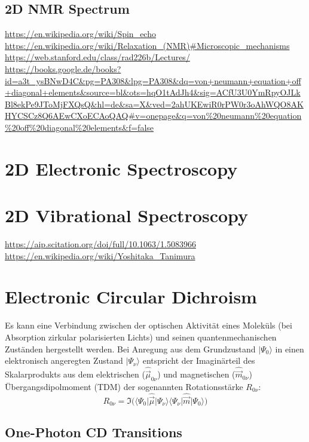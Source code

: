 \documentclass[9pt]{report}
\begin{document}
\subsection{2D NMR Spectrum}
\url{https://en.wikipedia.org/wiki/Spin_echo}\\
\url{https://en.wikipedia.org/wiki/Relaxation_(NMR)#Microscopic_mechanisms}\\
\url{https://web.stanford.edu/class/rad226b/Lectures/}\\
\url{https://books.google.de/books?id=a3t_ysBNwD4C&pg=PA308&lpg=PA308&dq=von+neumann+equation+off+diagonal+elements&source=bl&ots=hqO1tAdJh4&sig=ACfU3U0YmRpyOJLkBl8ekPe9JToMjFXQsQ&hl=de&sa=X&ved=2ahUKEwiR0rPW0r3oAhWQO8AKHYCSCz8Q6AEwCXoECAoQAQ#v=onepage&q=von%20neumann%20equation%20off%20diagonal%20elements&f=false}


\section{2D Electronic Spectroscopy}

\section{2D Vibrational Spectroscopy}
\url{https://aip.scitation.org/doi/full/10.1063/1.5083966}\\
\url{https://en.wikipedia.org/wiki/Yoshitaka_Tanimura}



\section{Electronic Circular Dichroism}
Es kann eine Verbindung zwischen der optischen Aktivität eines Moleküls (bei Absorption zirkular polarisierten Lichts) und seinen quantenmechanischen Zuständen hergestellt werden. Bei Anregung aus dem Grundzustand $|\Psi_{0}\rangle$ in einen elektronisch angeregten Zustand $|\Psi_{\nu}\rangle$ entspricht der Imaginärteil des Skalarprodukts aus dem elektrischen ($\hat{\vec{\mu}}_{0\nu}$) und magnetischen ($\hat{\vec{m}}_{0\nu}$) Übergangsdipolmoment (TDM) der sogenannten Rotationsstärke $R_{0\nu}$:
\begin{equation}
R_{0\nu}=\Im\Big(\big\langle\Psi_{0}\big|\hat{\vec{\mu}}\big|\Psi_{\nu}\big\rangle\big\langle\Psi_{\nu}\big|\hat{\vec{m}}\big|\Psi_{0}\big\rangle\Big)
\end{equation}

\subsection{One-Photon CD Transitions}
\end{document}
